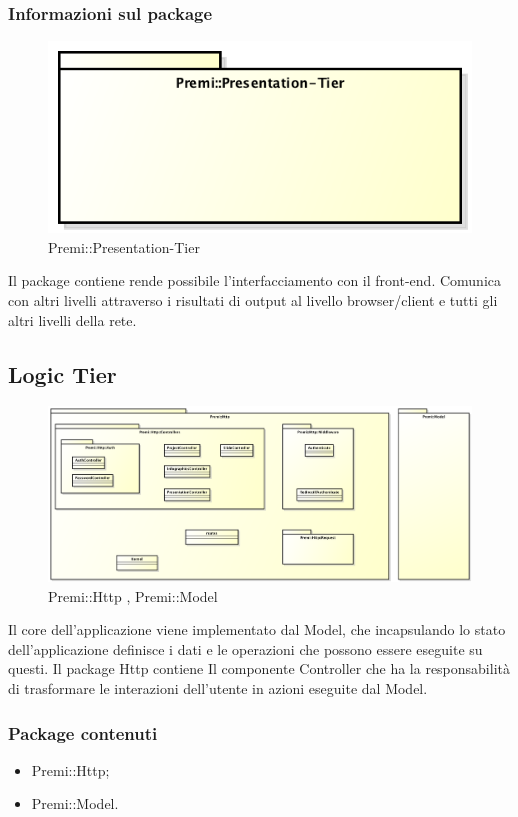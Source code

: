 	\subsubsection*{Informazioni sul package}
		\begin{figure}[h]
			\centering
			\includegraphics[width=0.5\linewidth]{img/premi_presentation-tier}
			\caption[Premi::Presentation-Tier]{Premi::Presentation-Tier}
		\end{figure}
		Il package contiene rende possibile l'interfacciamento con il \gls{front-end}. Comunica con altri livelli attraverso i risultati di output al livello browser/client e tutti gli altri livelli della rete.
		
		
\newpage
		
\subsection{Logic Tier}
	\begin{figure}[h]
		\centering
		\includegraphics[width=\linewidth]{img/back-end_logic-tier_package}
		\caption[Premi::Http , Premi::Model]{Premi::Http , Premi::Model}
	\end{figure}
	Il core dell'applicazione viene implementato dal Model, che incapsulando lo stato dell'applicazione definisce i dati e le operazioni che possono essere eseguite su questi. Il package Http contiene Il componente Controller che ha la responsabilità di trasformare le interazioni dell'utente in azioni eseguite dal Model.
	
	\subsubsection*{Package contenuti}
	\begin{itemize}
		\item Premi::Http;
		\item Premi::Model.
	\end{itemize}

